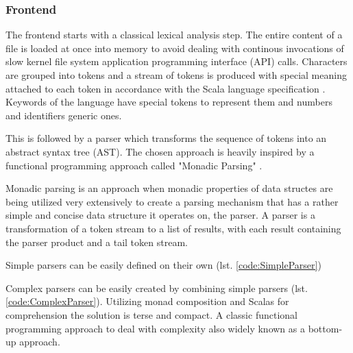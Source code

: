 \documentclass{VUMIFPSbakalaurinis}
\begin{document}
\subsubsection{Frontend}

The frontend starts with a classical lexical analysis step.
The entire content of a file is loaded at once into memory to avoid dealing with continous invocations of slow kernel file system application programming interface (API) calls.
Characters are grouped into tokens and a stream of tokens is produced with special meaning attached to each token in accordance with the Scala language specification \cite{ScalaSpec}.
Keywords of the language have special tokens to represent them and numbers and identifiers generic ones.

This is followed by a parser which transforms the sequence of tokens into an abstract syntax tree (AST).
The chosen approach is heavily inspired by a functional programming approach called "Monadic Parsing" \cite{MonadicParsing}.

Monadic parsing is an approach when monadic properties of data structes are being utilized very extensively to create a parsing mechanism that has a rather simple and concise data structure it operates on, the parser.
A parser is a transformation of a token stream to a list of results, with each result containing the parser product and a tail token stream.

Simple parsers can be easily defined on their own (lst. \ref{code:SimpleParser})


\noindent
\begin{minipage}{.45\textwidth}
  
\end{minipage}\hfill
\begin{minipage}{.45\textwidth}
  
\end{minipage}

Complex parsers can be easily created by combining simple parsers (lst. \ref{code:ComplexParser}).
Utilizing monad composition and Scalas for comprehension the solution is terse and compact.
A classic functional programming approach to deal with complexity also widely known as a bottom-up approach.
\end{document}
